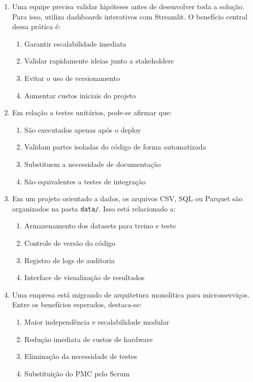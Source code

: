 \documentclass[12pt,a4paper]{article}
\begin{document}
\begin{enumerate}
\item Uma equipe precisa validar hipóteses antes de desenvolver toda a solução. Para isso, utiliza dashboards interativos com Streamlit. O benefício central dessa prática é:
\begin{enumerate}[label=\alph*)]
\item Garantir escalabilidade imediata
\item Validar rapidamente ideias junto a stakeholders
\item Evitar o uso de versionamento
\item Aumentar custos iniciais do projeto
\end{enumerate}

\item Em relação a testes unitários, pode-se afirmar que:
\begin{enumerate}[label=\alph*)]
\item São executados apenas após o deploy
\item Validam partes isoladas do código de forma automatizada
\item Substituem a necessidade de documentação
\item São equivalentes a testes de integração
\end{enumerate}

\item Em um projeto orientado a dados, os arquivos CSV, SQL ou Parquet são organizados na pasta \texttt{data/}. Isso está relacionado a:
\begin{enumerate}[label=\alph*)]
\item Armazenamento dos datasets para treino e teste
\item Controle de versão do código
\item Registro de logs de auditoria
\item Interface de visualização de resultados
\end{enumerate}

\item Uma empresa está migrando de arquitetura monolítica para microsserviços. Entre os benefícios esperados, destaca-se:
\begin{enumerate}[label=\alph*)]
\item Maior independência e escalabilidade modular
\item Redução imediata de custos de hardware
\item Eliminação da necessidade de testes
\item Substituição do PMC pelo Scrum
\end{enumerate}


\end{enumerate}
\end{document}
